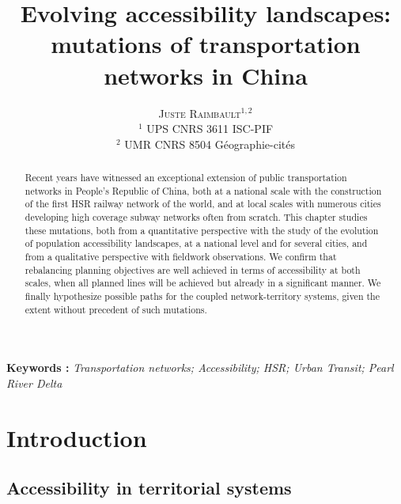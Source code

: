 \documentclass[11pt]{article}
\newcommand{\noun}[1]{\textsc{#1}}
\begin{document}
\title{Evolving accessibility landscapes: mutations of transportation networks in China}
\author{\noun{Juste Raimbault}$^{1,2}$\\
$^1$ UPS CNRS 3611 ISC-PIF\\
$^2$ UMR CNRS 8504 G{\'e}ographie-cit{\'e}s
}
\date{}


\maketitle

\justify


\begin{abstract}
Recent years have witnessed an exceptional extension of public transportation networks in People's Republic of China, both at a national scale with the construction of the first HSR railway network of the world, and at local scales with numerous cities developing high coverage subway networks often from scratch. This chapter studies these mutations, both from a quantitative perspective with the study of the evolution of population accessibility landscapes, at a national level and for several cities, and from a qualitative perspective with fieldwork observations. We confirm that rebalancing planning objectives are well achieved in terms of accessibility at both scales, when all planned lines will be achieved but already in a significant manner. We finally hypothesize possible paths for the coupled network-territory systems, given the extent without precedent of such mutations.
\end{abstract}

\textbf{Keywords : }\textit{Transportation networks; Accessibility; HSR; Urban Transit; Pearl River Delta}



\section{Introduction}

\subsection{Accessibility in territorial systems}
\end{document}
